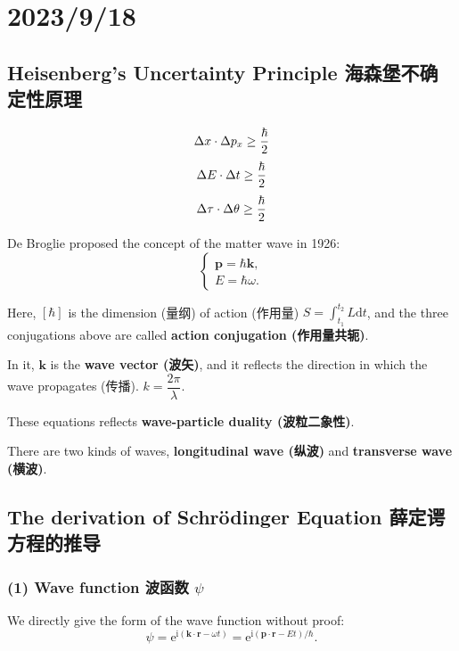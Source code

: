 \chapter{2023/9/18}\label{20230918}

\section{Heisenberg's Uncertainty Principle 海森堡不确定性原理}\label{heisenbergs-uncertainty-principle-ux6d77ux68eeux5821ux4e0dux786eux5b9aux6027ux539fux7406}

\[\Delta x \cdot \Delta p_x \geq {\hbar \over 2}\] \[\Delta E \cdot \Delta t \geq {\hbar \over 2}\] \[\Delta \tau \cdot \Delta \theta \geq {\hbar \over 2}\]

De Broglie proposed the concept of the matter wave in 1926: \[\left\{
    \begin{array}{l}
        \boldsymbol p = \hbar \boldsymbol k, \\
        E=\hbar \omega.
    \end{array}
\right.\]

Here, \([\hbar]\) is the dimension (量纲) of action (作用量) \(\displaystyle S=\int_{t_1}^{t_2}L\mathrm dt\), and the three conjugations above are called \textbf{action conjugation (作用量共轭)}.

In it, \(\boldsymbol k\) is the \textbf{wave vector (波矢)}, and it reflects the direction in which the wave propagates (传播). \(k = \dfrac{2 \pi}{\lambda}\).

These equations reflects \textbf{wave-particle duality (波粒二象性)}.

There are two kinds of waves, \textbf{longitudinal wave (纵波)} and \textbf{transverse wave (横波)}.

\section{The derivation of Schrödinger Equation 薛定谔方程的推导}\label{the-derivation-of-schruxf6dinger-equation-ux859bux5b9aux8c14ux65b9ux7a0bux7684ux63a8ux5bfc}

\subsection*{(1) Wave function 波函数 \(\psi\)}\label{wave-function-ux6ce2ux51fdux6570-psi}

We directly give the form of the wave function without proof: \[\psi = \mathrm e^{\mathrm i(\boldsymbol k \cdot \boldsymbol r - \omega t)} = \mathrm e^{\mathrm {i}(\boldsymbol p \cdot \boldsymbol r - E t) / \hbar}.\]

